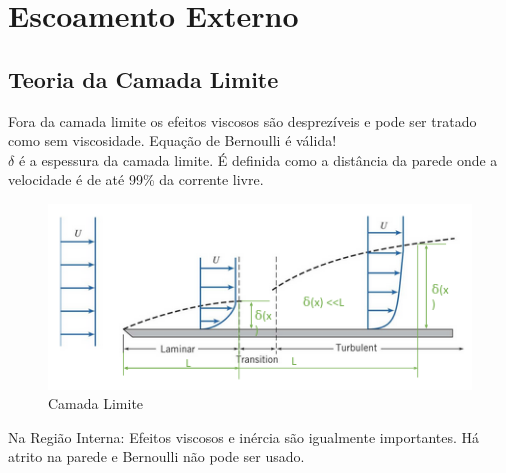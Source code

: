 \documentclass[a4paper, 12pt]{article}
\begin{document}
\section{Escoamento Externo}
\subsection{Teoria da Camada Limite}
	Fora da camada limite os efeitos viscosos são desprezíveis e pode ser tratado como sem viscosidade. Equação de Bernoulli é válida!\\
	
	$\delta$ é a espessura da camada limite.
	É definida como a distância da parede onde a velocidade é de até 99\% da corrente livre.
	\begin{figure}[h]
		\centering
		\includegraphics[width=0.7\linewidth]{imagens/ee1}
		\caption{Camada Limite}
		\label{fig:ee1}
	\end{figure}
	Na Região Interna: Efeitos viscosos e inércia são igualmente importantes. 
	Há atrito na parede e Bernoulli não pode ser usado.
	
\end{document}

